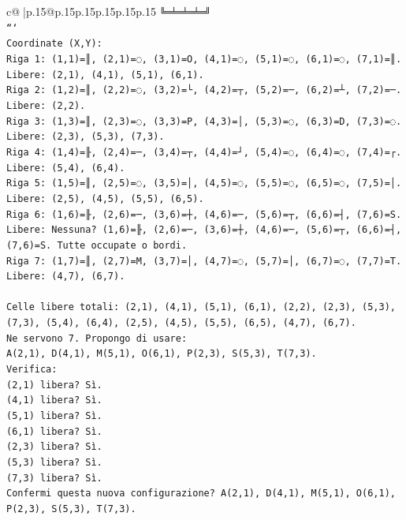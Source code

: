 \documentclass{article}
\begin{document}
{\begin{supertabular}{c@{$\;$}|p{.15\linewidth}@{}p{.15\linewidth}p{.15\linewidth}p{.15\linewidth}p{.15\linewidth}p{.15\linewidth}}
{{{\texttt{╚═╧═╧═╧═╝} \\
\texttt{```} \\
\texttt{Coordinate (X,Y):} \\
\texttt{Riga 1: (1,1)=║, (2,1)=◌, (3,1)=O, (4,1)=◌, (5,1)=◌, (6,1)=◌, (7,1)=║. Libere: (2,1), (4,1), (5,1), (6,1).} \\
\texttt{Riga 2: (1,2)=║, (2,2)=◌, (3,2)=└, (4,2)=┬, (5,2)=─, (6,2)=┴, (7,2)=─. Libere: (2,2).} \\
\texttt{Riga 3: (1,3)=║, (2,3)=◌, (3,3)=P, (4,3)=│, (5,3)=◌, (6,3)=D, (7,3)=◌. Libere: (2,3), (5,3), (7,3).} \\
\texttt{Riga 4: (1,4)=╟, (2,4)=─, (3,4)=┬, (4,4)=┘, (5,4)=◌, (6,4)=◌, (7,4)=┌. Libere: (5,4), (6,4).} \\
\texttt{Riga 5: (1,5)=║, (2,5)=◌, (3,5)=│, (4,5)=◌, (5,5)=◌, (6,5)=◌, (7,5)=│. Libere: (2,5), (4,5), (5,5), (6,5).} \\
\texttt{Riga 6: (1,6)=╟, (2,6)=─, (3,6)=┼, (4,6)=─, (5,6)=┬, (6,6)=┤, (7,6)=S. Libere: Nessuna? (1,6)=╟, (2,6)=─, (3,6)=┼, (4,6)=─, (5,6)=┬, (6,6)=┤, (7,6)=S. Tutte occupate o bordi.} \\
\texttt{Riga 7: (1,7)=║, (2,7)=M, (3,7)=│, (4,7)=◌, (5,7)=│, (6,7)=◌, (7,7)=T. Libere: (4,7), (6,7).} \\
\\ 
\texttt{Celle libere totali: (2,1), (4,1), (5,1), (6,1), (2,2), (2,3), (5,3), (7,3), (5,4), (6,4), (2,5), (4,5), (5,5), (6,5), (4,7), (6,7).} \\
\texttt{Ne servono 7. Propongo di usare:} \\
\texttt{A(2,1), D(4,1), M(5,1), O(6,1), P(2,3), S(5,3), T(7,3).} \\
\texttt{Verifica:} \\
\texttt{(2,1) libera? Sì.} \\
\texttt{(4,1) libera? Sì.} \\
\texttt{(5,1) libera? Sì.} \\
\texttt{(6,1) libera? Sì.} \\
\texttt{(2,3) libera? Sì.} \\
\texttt{(5,3) libera? Sì.} \\
\texttt{(7,3) libera? Sì.} \\
\texttt{Confermi questa nuova configurazione? A(2,1), D(4,1), M(5,1), O(6,1), P(2,3), S(5,3), T(7,3).} \\
            }
        }
    }
     \\ \\


\end{supertabular}}
\end{document}
